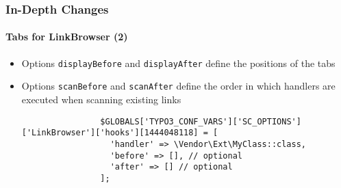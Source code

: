 \begin{frame}[fragile]
	\frametitle{In-Depth Changes}
	\framesubtitle{Tabs for LinkBrowser (2)}

	\lstset{basicstyle=\tiny\ttfamily}

	\begin{itemize}

		\item Options \texttt{displayBefore} and \texttt{displayAfter} define the positions of the tabs

		\item Options \texttt{scanBefore} and \texttt{scanAfter} define the order in which handlers are
			executed when scanning existing links

			\begin{lstlisting}
				$GLOBALS['TYPO3_CONF_VARS']['SC_OPTIONS']['LinkBrowser']['hooks'][1444048118] = [
				  'handler' => \Vendor\Ext\MyClass::class,
				  'before' => [], // optional
				  'after' => [] // optional
				];
			\end{lstlisting}

	\end{itemize}

\end{frame}


